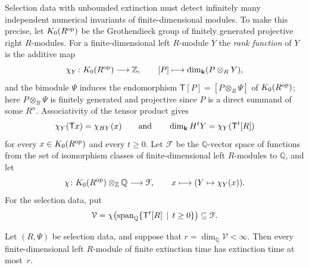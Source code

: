 Selection data with unbounded extinction must detect infinitely many
independent numerical invariants of finite-dimensional modules. To make this
precise, let $K_0(R^{\mathrm{op}})$ be the Grothendieck group of finitely generated
projective right $R$-modules. For a finite-dimensional left $R$-module $Y$ the
\emph{rank function} of $Y$ is the additive map
\[
  \chi_Y\colon K_0(R^{\mathrm{op}})\longrightarrow\mathbb{Z},\qquad
  [P]\longmapsto\dim_{\mathbf{k}}(P\otimes_RY),
\]
and the bimodule $\Psi$ induces the endomorphism
${\mathsf{T}[P]=[P\otimes_R\Psi]}$
of $K_0(R^{\mathrm{op}})$; here ${P\otimes_R\Psi}$ is finitely generated and projective
since $P$ is a direct summand of some $R^n$. Associativity of the tensor
product gives
\begin{equation}
  \label{eq:rank-shift}
  \chi_Y(\mathsf{T}x)=\chi_{HY}(x)\qquad\text{and}\qquad
  \dim_{\mathbf{k}} H^tY=\chi_Y(\mathsf{T}^t[R])
\end{equation}
for every ${x\in K_0(R^{\mathrm{op}})}$ and every ${t\geq0}$. Let $\mathcal{F}$ be the
$\mathbb{Q}$-vector space of functions from the set of isomorphism classes of
finite-dimensional left $R$-modules to $\mathbb{Q}$, and let
\[
  \chi\colon K_0(R^{\mathrm{op}})\otimes_{\mathbb{Z}}\mathbb{Q}\longrightarrow\mathcal{F},
  \qquad x\longmapsto(Y\mapsto\chi_Y(x)).
\]
For the selection data, put
\[
  \mathcal{V}=\chi\bigl(\operatorname{span}_{\mathbb{Q}}
  \set{\mathsf{T}^t[R]}[t\geq0]\bigr)\subseteq\mathcal{F}.
\]

\begin{proposition}
  \label{prop:rank-obstruction}
  Let $(R,\Psi)$ be selection data, and suppose that ${r=\dim_{\mathbb Q}\mathcal
  V<\infty}$. Then every
  finite-dimensional left $R$-module of finite extinction time has extinction
  time at most~$r$.
\end{proposition}

